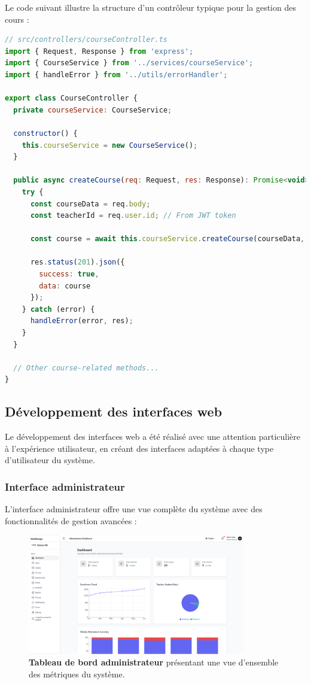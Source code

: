 Le code suivant illustre la structure d'un contrôleur typique pour la gestion des cours :

\begin{lstlisting}[style=codestyle, language=JavaScript]
// src/controllers/courseController.ts
import { Request, Response } from 'express';
import { CourseService } from '../services/courseService';
import { handleError } from '../utils/errorHandler';

export class CourseController {
  private courseService: CourseService;
  
  constructor() {
    this.courseService = new CourseService();
  }
  
  public async createCourse(req: Request, res: Response): Promise<void> {
    try {
      const courseData = req.body;
      const teacherId = req.user.id; // From JWT token
      
      const course = await this.courseService.createCourse(courseData, teacherId);
      
      res.status(201).json({
        success: true,
        data: course
      });
    } catch (error) {
      handleError(error, res);
    }
  }
  
  // Other course-related methods...
}
\end{lstlisting}

\subsection{Développement des interfaces web}

Le développement des interfaces web a été réalisé avec une attention particulière à l'expérience utilisateur, en créant des interfaces adaptées à chaque type d'utilisateur du système.

\subsubsection{Interface administrateur}

L'interface administrateur offre une vue complète du système avec des fonctionnalités de gestion avancées :

\begin{figure}[H]
  \centering
  \includegraphics[width=0.85\textwidth,keepaspectratio]{pfe-pics/admin/Screenshot 2025-06-09 at 22-38-06 Vite React TS.png}
  \caption{\textbf{Tableau de bord administrateur} présentant une vue d'ensemble des métriques du système.}
  \label{fig:admin_dashboard}
\end{figure}

